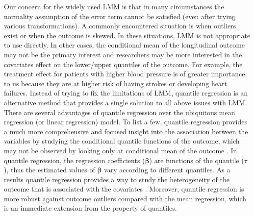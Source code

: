 Our concern for the widely used LMM is that in many circumstances the normality assumption of the error term cannot be satisfied (even after trying various transformations). A commonly encountered situation is when outliers exist or when the outcome is skewed. In these situations, LMM is not appropriate to use directly. In other cases, the conditional mean of the longitudinal outcome may not be the primary interest and researchers may be more interested in the covariates effect on the lower/upper quantiles of the outcome. For example, the treatment effect for patients with higher blood pressure is of greater importance to us because they are at higher risk of having strokes or developing heart failures. Instead of trying to fix the limitations of LMM, quantile regression is an alternative method that provides a single solution to all above issues with LMM. There are several advantages of quantile regression over the ubiquitous mean regression (or linear regression) model. To list a few, quantile regression provides a much more comprehensive and focused insight into the association between the variables by studying the conditional quantile functions of the outcome,  which may not be observed by looking only at conditional mean of the outcome \citep{koenker2005quantile}. In quantile regression, the regression coefficients (${\boldsymbol \beta}$) are functions of the quantile ($\tau$), thus the estimated values of $\boldsymbol{\beta}$ vary according to different quantiles. As a results quantile regression provides a way to study the heterogeneity of the outcome that is associated with the covariates \citep{koenker2005quantile}. Moreover, quantile regression is more robust against outcome outliers compared with the mean regression, which is an immediate extension from the property of quantiles. \par

